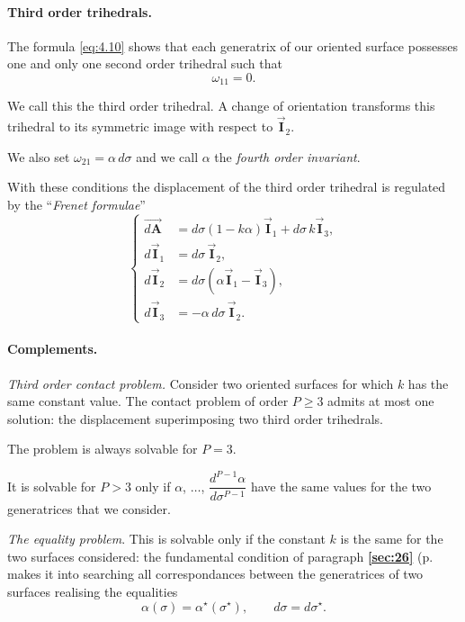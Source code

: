 \documentclass[leqno,11pt]{book}
\numberwithin{equation}{chapter}
\theoremstyle{shape1}
\theoremstyle{shapesmall}
\newcommand{\fsref}[1]{{\rm\textsection\textbf{\ref{sec:#1}}}}
\newcommand{\str}{^{\star}}
\newcommand{\rvec}[1]{\vec{\mathbf{#1}}}
\newcommand{\ivec}{\rvec{I}}
\newcommand{\somespace}{\vspace{9pt}}
\begin{document}
\paragraph{Third order trihedrals.}
\label{sec:54}
The formula \eqref{eq:4.10} shows that each generatrix of our oriented surface possesses one and only one second order trihedral such that
\[
\omega_{11}=0.
\]

We call this the third order trihedral. A change of orientation transforms this trihedral to its symmetric image with respect to $\ivec_{2}$.

We also set $\omega_{21}=\alpha\,d\sigma$ and we call $\alpha$ the \emph{fourth order invariant}.

With these conditions the displacement of the third order trihedral is regulated by the ``\emph{Frenet formulae}''
\begin{equation}
  \label{eq:4.11}
  \left\{
    \begin{aligned}
      \overrightarrow{d\mathbf{A}}&=d\sigma(1-k\alpha)\ivec_{1}+d\sigma\,k\ivec_{3},\\
      d\ivec_{1}&=d\sigma\,\ivec_{2},\\
      d\ivec_{2}&=d\sigma(\alpha\ivec_{1}-\ivec_{3}),\\
      d\ivec_{3}&=-\alpha\,d\sigma\,\ivec_{2}.
    \end{aligned}
  \right.
\end{equation}

\paragraph{Complements.}
\label{sec:55}
\emph{Third order contact problem.} Consider two oriented surfaces for which $k$ has the same constant value. The contact problem of order $P\ge 3$ admits at most one solution: the displacement superimposing two third order trihedrals.

The problem is always solvable for $P=3$.

It is solvable for $P>3$ only if $\alpha$, $\dots$, $\dfrac{d^{P-1}\alpha}{d\sigma^{P-1}}$ have the same values for the two generatrices that we consider.

\somespace

\emph{The equality problem}. This is solvable only if the constant $k$ is the same for the two surfaces considered: the fundamental condition of paragraph \fsref{26} (p.~\pageref{sec:26} makes it into searching all correspondances between the generatrices of two surfaces realising the equalities
\[
\alpha(\sigma)=\alpha\str(\sigma\str),\qquad d\sigma=d\sigma\str.
\]
\end{document}
